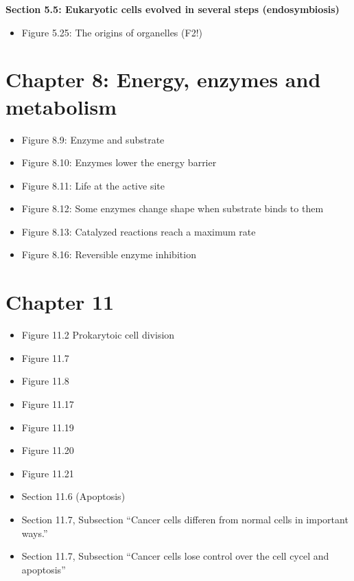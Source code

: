 \documentclass[
]{book}
\providecommand{\tightlist}{%
  \setlength{\itemsep}{0pt}\setlength{\parskip}{0pt}}
\begin{document}
\textbf{Section 5.5: Eukaryotic cells evolved in several steps (endosymbiosis)}

\begin{itemize}
\tightlist
\item
  Figure 5.25: The origins of organelles (F2!)
\end{itemize}

\hypertarget{chapter-8-energy-enzymes-and-metabolism}{%
\section{Chapter 8: Energy, enzymes and metabolism}\label{chapter-8-energy-enzymes-and-metabolism}}

\begin{itemize}
\tightlist
\item
  Figure 8.9: Enzyme and substrate
\item
  Figure 8.10: Enzymes lower the energy barrier
\item
  Figure 8.11: Life at the active site
\item
  Figure 8.12: Some enzymes change shape when substrate binds to them
\item
  Figure 8.13: Catalyzed reactions reach a maximum rate
\item
  Figure 8.16: Reversible enzyme inhibition
\end{itemize}

\hypertarget{chapter-11}{%
\section{Chapter 11}\label{chapter-11}}

\begin{itemize}
\item
  Figure 11.2 Prokarytoic cell division
\item
  Figure 11.7
\item
  Figure 11.8
\item
  Figure 11.17
\item
  Figure 11.19
\item
  Figure 11.20
\item
  Figure 11.21
\item
  Section 11.6 (Apoptosis)
\item
  Section 11.7, Subsection ``Cancer cells differen from normal cells in important ways.''
\item
  Section 11.7, Subsection ``Cancer cells lose control over the cell cycel and apoptosis''
\end{itemize}
\end{document}
